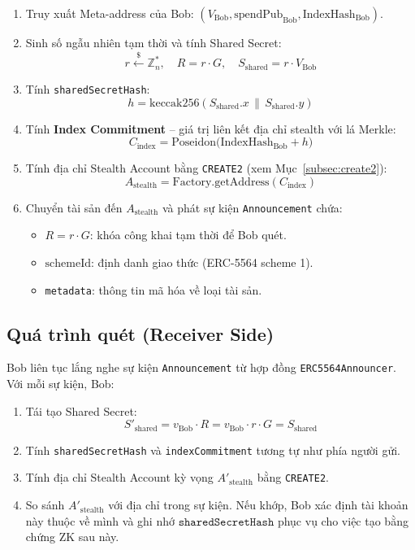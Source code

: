 \documentclass[../DoAn.tex]{subfiles}
\begin{document}
\begin{enumerate}
    \item Truy xuất Meta-address của Bob: \((V_{\text{Bob}}, \text{spendPub}_{\text{Bob}}, \text{IndexHash}_{\text{Bob}})\).

    \item Sinh số ngẫu nhiên tạm thời và tính Shared Secret:
    \[
        r \xleftarrow{\$} \mathbb{Z}_n^*, \quad R = r \cdot G, \quad S_{\text{shared}} = r \cdot V_{\text{Bob}}
    \]

    \item Tính \texttt{sharedSecretHash}:
    \[
        h = \text{keccak256}(S_{\text{shared}}.x \,\|\, S_{\text{shared}}.y)
    \]

    \item Tính \textbf{Index Commitment} -- giá trị liên kết địa chỉ stealth với lá Merkle:
    \[
        C_{\text{index}} = \text{Poseidon}\bigl(\text{IndexHash}_{\text{Bob}} + h\bigr)
    \]

    \item Tính địa chỉ Stealth Account bằng \texttt{CREATE2} (xem Mục~\ref{subsec:create2}):
    \[
        A_{\text{stealth}} = \text{Factory.getAddress}(C_{\text{index}})
    \]

    \item Chuyển tài sản đến \(A_{\text{stealth}}\) và phát sự kiện \texttt{Announcement} chứa:
    \begin{itemize}
        \item \(R = r \cdot G\): khóa công khai tạm thời để Bob quét.
        \item \(\text{schemeId}\): định danh giao thức (ERC-5564 scheme 1).
        \item \texttt{metadata}: thông tin mã hóa về loại tài sản.
    \end{itemize}
\end{enumerate}

\subsection{Quá trình quét (Receiver Side)}
\label{subsec:scanning}

Bob liên tục lắng nghe sự kiện \texttt{Announcement} từ hợp đồng \texttt{ERC5564Announcer}. Với mỗi sự kiện, Bob:

\begin{enumerate}
    \item Tái tạo Shared Secret:
    \[
        S'_{\text{shared}} = v_{\text{Bob}} \cdot R = v_{\text{Bob}} \cdot r \cdot G = S_{\text{shared}}
    \]

    \item Tính \texttt{sharedSecretHash} và \texttt{indexCommitment} tương tự như phía người gửi.

    \item Tính địa chỉ Stealth Account kỳ vọng \(A'_{\text{stealth}}\) bằng \texttt{CREATE2}.

    \item So sánh \(A'_{\text{stealth}}\) với địa chỉ trong sự kiện. Nếu khớp, Bob xác định tài khoản này thuộc về mình và ghi nhớ \(\texttt{sharedSecretHash}\) phục vụ cho việc tạo bằng chứng ZK sau này.
\end{enumerate}
\end{document}
